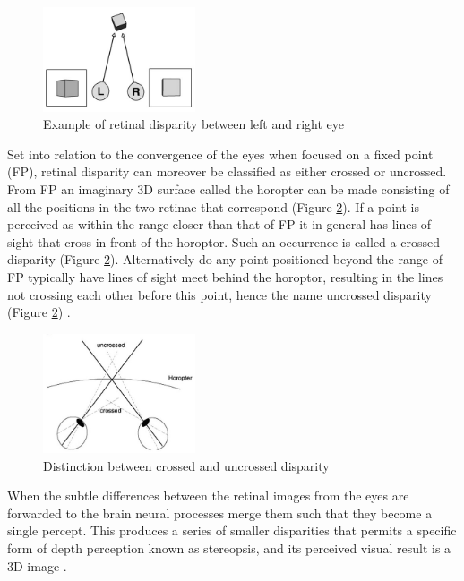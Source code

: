 \begin{figure}[h!]
   \centering
   \includegraphics[width=0.4\textwidth]{figures/cue11.jpg}
   \caption{Example of retinal disparity between  left and right eye \cite{Retina}}\label{fig:cue11}
\end{figure}

Set into relation to the convergence of the eyes when focused on a fixed point (FP), retinal disparity can moreover be classified as either crossed or uncrossed. From FP an imaginary 3D surface called the horopter can be made consisting of all the positions in the two retinae that correspond (Figure \ref{fig:cue12}). If a point is perceived as within the range closer than that of FP it in general has lines of sight that cross in front of the horoptor. Such an occurrence is called a crossed disparity (Figure \ref{fig:cue12}). Alternatively do any point positioned beyond the range of FP typically have lines of sight meet behind the horoptor, resulting in the lines not crossing each other before this point, hence the name uncrossed disparity (Figure \ref{fig:cue12}) \cite{McCoun2010}.

\begin{figure}[h!]
   \centering
   \includegraphics[width=0.4\textwidth]{figures/cue12.jpg}
   \caption{Distinction between crossed and uncrossed disparity \cite{Heeger}}\label{fig:cue12}
\end{figure}

When the subtle differences between the retinal images from the eyes are forwarded to the brain neural processes merge them such that they become a single percept. This produces a series of smaller disparities that permits a specific form of depth perception known as stereopsis, and its perceived visual result is a 3D image \cite{Parker2007}.

